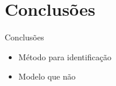 
\section{Conclusões}

\begin{frame}{Conclusões}
\begin{itemize}
\item Método para identificação\pause 
\item Modelo que não\pause 
\end{itemize}
\end{frame}

